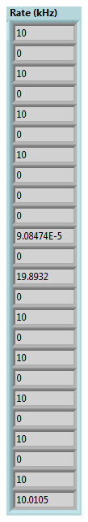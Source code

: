\begin{figure}[H]
	\centering
	\begin{minipage}{0.24\textwidth}
		\centering
		\includegraphics[width=.75\linewidth]{IMG/ch5/latch_tests/fig16}

\end{minipage}
\end{figure}
